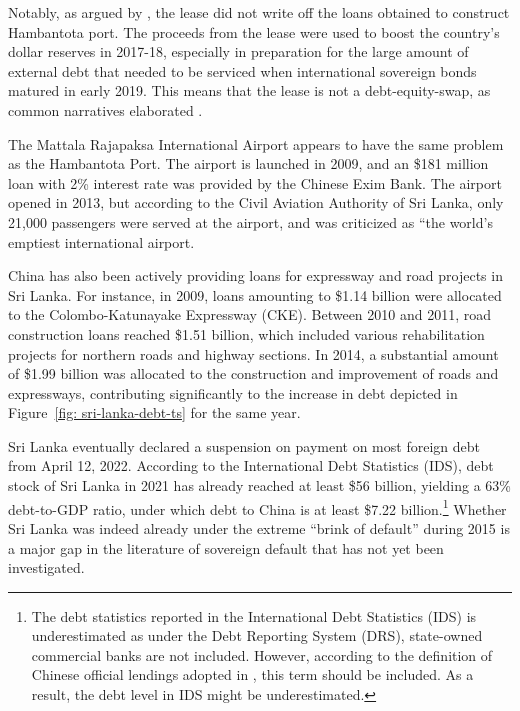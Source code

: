 Notably, as argued by \citet*{Moramudali_2019}, the lease did not write off the loans obtained to construct Hambantota port. The proceeds from the lease were used to boost the country's dollar reserves in 2017-18, especially in preparation for the large amount of external debt that needed to be serviced when international sovereign bonds matured in early 2019. This means that the lease is not a debt-equity-swap, as common narratives elaborated \citep*{Moramudali_2020}.

The Mattala Rajapaksa International Airport appears to have the same problem as the Hambantota Port. The airport is launched in 2009, and an \$181 million loan with 2\% interest rate was provided by the Chinese Exim Bank. The airport opened in 2013, but according to the Civil Aviation Authority of Sri Lanka, only 21,000 passengers were served at the airport, and was criticized as ``the world's emptiest international airport\citep*{shepard-16-airport-empty}.

China has also been actively providing loans for expressway and road projects in Sri Lanka. For instance, in 2009, loans amounting to \$1.14 billion were allocated to the Colombo-Katunayake Expressway (CKE). Between 2010 and 2011, road construction loans reached \$1.51 billion, which included various rehabilitation projects for northern roads and highway sections. In 2014, a substantial amount of \$1.99 billion was allocated to the construction and improvement of roads and expressways, contributing significantly to the increase in debt depicted in Figure~\ref{fig: sri-lanka-debt-ts} for the same year.

Sri Lanka eventually declared a suspension on payment on most foreign debt from April 12, 2022. According to the International Debt Statistics (IDS), debt stock of Sri Lanka in 2021 has already reached at least \$56 billion, yielding a 63\% debt-to-GDP ratio, under which debt to China is at least \$7.22 billion.\footnote{
    The debt statistics reported in the International Debt Statistics (IDS) is underestimated as under the Debt Reporting System (DRS), state-owned commercial banks are not included. However, according to the definition of Chinese official lendings adopted in \citet*{Horn-Reinhart-Trebesch-21}, this term should be included. As a result, the debt level in IDS might be underestimated.
}
Whether Sri Lanka was indeed already under the extreme ``brink of default'' during 2015 is a major gap in the literature of sovereign default that has not yet been investigated.
